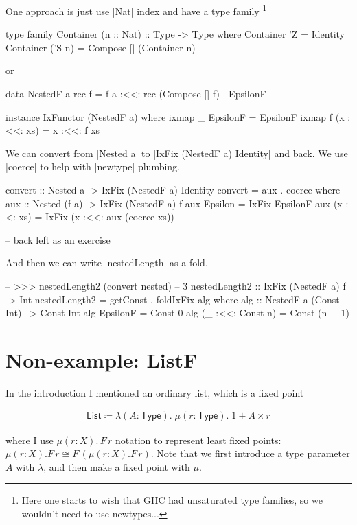 One approach is just use |Nat| index and have a type family%
\footnote{Here one starts to wish that GHC had unsaturated type families, so we wouldn't need to use newtypes...}
\begin{code}
type family Container (n :: Nat) :: Type -> Type where
    Container 'Z     = Identity
    Container ('S n) = Compose [] (Container n)
\end{code}

or

\begin{code}
data NestedF a rec f
    = f a :<<: rec (Compose [] f)
    | EpsilonF

instance IxFunctor (NestedF a) where
    ixmap _ EpsilonF    = EpsilonF
    ixmap f (x :<<: xs) = x :<<: f xs
\end{code}

We can convert from |Nested a| to |IxFix (NestedF a) Identity| and back.
We use |coerce| to help with |newtype| plumbing.

\begin{code}
convert :: Nested a -> IxFix (NestedF a) Identity
convert = aux . coerce where
    aux :: Nested (f a) -> IxFix (NestedF a) f
    aux Epsilon    = IxFix EpsilonF
    aux (x :<: xs) = IxFix (x :<<: aux (coerce xs))

-- back left as an exercise
\end{code}

And then we can write |nestedLength| as a fold.

\begin{code}
-- >>> nestedLength2 (convert nested)
-- 3
nestedLength2 :: IxFix (NestedF a) f -> Int
nestedLength2 = getConst . foldIxFix alg where
    alg :: NestedF a (Const Int) ~> Const Int
    alg EpsilonF         = Const 0
    alg (_ :<<: Const n) = Const (n + 1)
\end{code}

\section{Non-example: ListF}

In the introduction I mentioned an ordinary list, which is a fixed point

\begin{align*}
  \mathsf{List} \coloneqq \lambda (A : \mathsf{Type}).\; \mu (r : \mathsf{Type}).\; 1 + A \times r
\end{align*}

where I use $\mu (r : X).\, F\, r$ notation to represent least fixed points:
$\mu (r : X). F\, r \cong F\, (\mu (r : X). F\, r)$.
Note that we first introduce a type parameter $A$ with $\lambda$, and then make
a fixed point with $\mu$.

